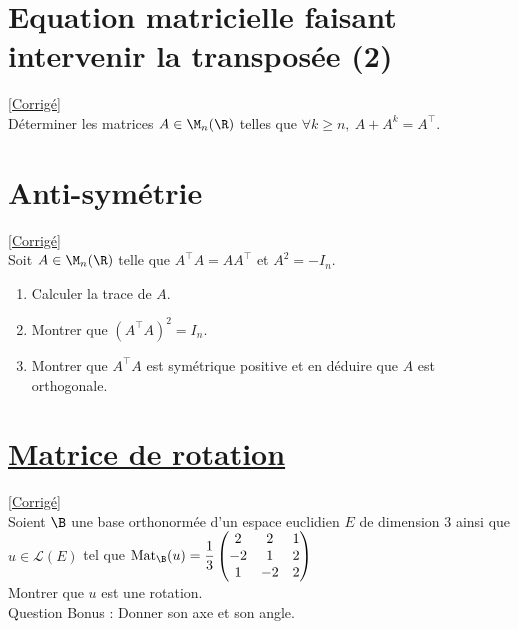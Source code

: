 \documentclass[8pt]{book}
\begin{document}
\section{Equation matricielle faisant intervenir la transposée (2) }
\label{Equation matricielle faisant intervenir la transposée (2)}
\textcolor{blue}{\hyperref[Equation matricielle faisant intervenir la transposée (2) corrigé]{[Corrigé]}}\\
Déterminer les matrices $A\in \M_n(\R)$ telles que $\forall k\geq n,\ A+A^k=A^\top$.

\section{Anti-symétrie }
\label{Anti-symétrie}
\textcolor{blue}{\hyperref[Anti-symétrie corrigé]{[Corrigé]}}\\
Soit $A\in \M_n(\R)$ telle que $A^\top A=AA^\top$ et $A^2=-I_n$.
\begin{enumerate}
	\item Calculer la trace de $A$.
	\item Montrer que $(A^\top A)^2=I_n$.
	\item Montrer que $A^\top A$ est symétrique positive et en déduire que $A$ est orthogonale.
\end{enumerate}

\section{\underline{Matrice de rotation} }
\label{Matrice de rotation}
\textcolor{blue}{\hyperref[Matrice de rotation corrigé]{[Corrigé]}}\\
Soient $\B$ une base orthonormée d'un espace euclidien $E$ de dimension 3 ainsi que $u\in\mathcal L(E)$ tel que $\operatorname{Mat}_\B(u)=\displaystyle\frac{1}{3}\begin{pmatrix}
	2 & 2 & 1\\
	-2 &1 &2\\
	1& -2& 2
\end{pmatrix}$
\\Montrer que $u$ est une rotation.
\\Question Bonus : Donner son axe et son angle.
\end{document}
